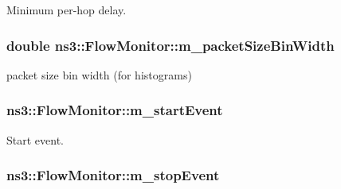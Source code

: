 Minimum per-\/hop delay. 

\subsubsection[{\texorpdfstring{m\+\_\+packet\+Size\+Bin\+Width}{m_packetSizeBinWidth}}]{\setlength{\rightskip}{0pt plus 5cm}double ns3\+::\+Flow\+Monitor\+::m\+\_\+packet\+Size\+Bin\+Width\hspace{0.3cm}{\ttfamily [private]}}\hypertarget{classns3_1_1FlowMonitor_a95ee97272b70c081d3906028fd2d8252}{}\label{classns3_1_1FlowMonitor_a95ee97272b70c081d3906028fd2d8252}


packet size bin width (for histograms) 

\subsubsection[{\texorpdfstring{m\+\_\+start\+Event}{m_startEvent}}]{ ns3\+::\+Flow\+Monitor\+::m\+\_\+start\+Event\hspace{0.3cm}{\ttfamily [private]}}\hypertarget{classns3_1_1FlowMonitor_a581fcc5591d673b3509967245cd447ea}{}\label{classns3_1_1FlowMonitor_a581fcc5591d673b3509967245cd447ea}


Start event. 

\subsubsection[{\texorpdfstring{m\+\_\+stop\+Event}{m_stopEvent}}]{ ns3\+::\+Flow\+Monitor\+::m\+\_\+stop\+Event\hspace{0.3cm}{\ttfamily [private]}}\hypertarget{classns3_1_1FlowMonitor_adb907fb61dc3bde7f6568d0860552f1e}{}\label{classns3_1_1FlowMonitor_adb907fb61dc3bde7f6568d0860552f1e}



